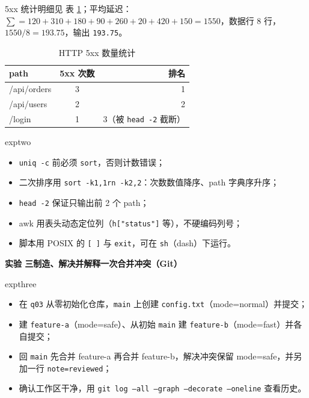 \documentclass[11pt,a4paper,fontset=none]{ctexart}
\newcommand{\expbanner}[3]{%
  \par\vspace{1.6em}
  \begin{tcolorbox}[enhanced, colback=#1!10, colframe=#1!85!black,
    boxrule=1pt, arc=3pt, left=8pt, right=8pt, top=6pt, bottom=6pt]
    {\Large\bfseries\color{#1!70!black}实验 #2\qquad #3}
  \end{tcolorbox}
  \par\vspace{0.2em}\noindent\ignorespaces
}
\begin{document}
5xx 统计明细见 表 \ref{tab:5xx}；平均延迟：
$\sum = 120+310+180+90+260+20+420+150 = 1550$，数据行 8 行，
$1550 / 8 = 193.75$，输出 \texttt{193.75}。

\begin{table}[htbp]
  \centering
  \caption{HTTP 5xx 数量统计}
  \label{tab:5xx}
  \begin{tabular}{lcr}
    \toprule
    path & 5xx 次数 & 排名 \\
    \midrule
    /api/orders & 3 & 1 \\
    /api/users  & 2 & 2 \\
    /login      & 1 & 3（被 \texttt{head -2} 截断） \\
    \bottomrule
  \end{tabular}
\end{table}

\begin{trapbox}{exptwo}
\begin{itemize}[leftmargin=1.4em, itemsep=1pt]
  \item \texttt{uniq -c} 前必须 \texttt{sort}，否则计数错误；
  \item 二次排序用 \texttt{sort -k1,1rn -k2,2}：次数数值降序、path 字典序升序；
  \item \texttt{head -2} 保证只输出前 2 个 path；
  \item awk 用表头动态定位列（\texttt{h["status"]} 等），不硬编码列号；
  \item 脚本用 POSIX 的 \texttt{[ ]} 与 \texttt{exit}，可在 \texttt{sh}（dash）下运行。
\end{itemize}
\end{trapbox}

\expbanner{expthree}{三}{制造、解决并解释一次合并冲突（Git）}

\begin{reqbox}{expthree}
\begin{itemize}[leftmargin=1.4em, itemsep=1pt]
  \item 在 \texttt{q03} 从零初始化仓库，\texttt{main} 上创建 \texttt{config.txt}（mode=normal）并提交；
  \item 建 \texttt{feature-a}（mode=safe）、从初始 \texttt{main} 建 \texttt{feature-b}（mode=fast）并各自提交；
  \item 回 \texttt{main} 先合并 feature-a 再合并 feature-b，解决冲突保留 mode=safe，并另加一行
        \texttt{note=reviewed}；
  \item 确认工作区干净，用 \texttt{git log --all --graph --decorate --oneline} 查看历史。
\end{itemize}
\end{reqbox}
\end{document}
